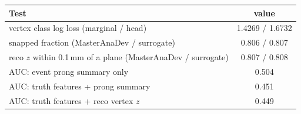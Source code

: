 \begin{tabular}{lc}
\toprule
Test & value \\
\midrule
vertex class log loss (marginal / head) & 1.4269 / 1.6732 \\
snapped fraction (MasterAnaDev / surrogate) & 0.806 / 0.807 \\
reco $z$ within 0.1\,mm of a plane (MasterAnaDev / surrogate) & 0.807 / 0.808 \\
\midrule
AUC: event prong summary only & 0.504 \\
AUC: truth features + prong summary & 0.451 \\
AUC: truth features + reco vertex $z$ & 0.449 \\
\bottomrule
\end{tabular}

